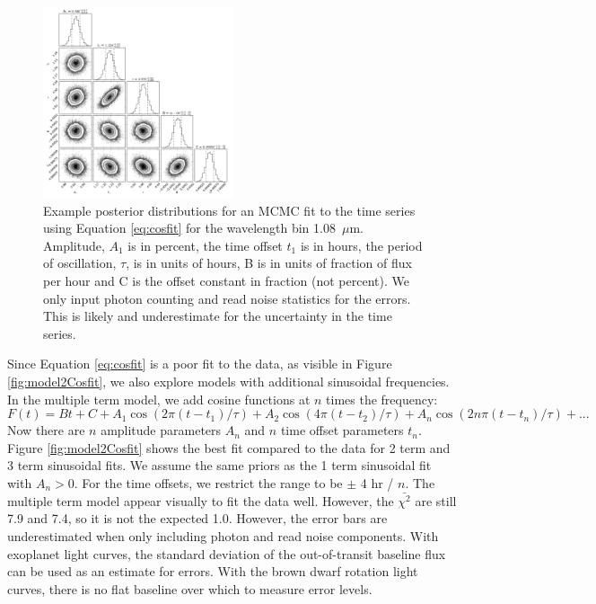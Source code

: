 \documentclass[twocolumn]{aastex6}
\begin{document}
\begin{figure}
\begin{centering}
\includegraphics[width=0.5\textwidth]{corner_example.pdf}
\caption{Example posterior distributions for an MCMC fit to the time series using Equation \ref{eq:cosfit} for the wavelength bin 1.08~$\mu$m.
Amplitude, $A_1$ is in percent, the time offset $t_1$ is in hours, the period of oscillation, $\tau$, is in units of hours, B is in units of fraction of flux per hour and C is the offset constant in fraction (not percent).
We only input photon counting and read noise statistics for the errors.
This is likely and underestimate for the uncertainty in the time series.
}\label{fig:postCosfit}
\end{centering}
\end{figure}

Since Equation \ref{eq:cosfit} is a poor fit to the data, as visible in Figure \ref{fig:model2Cosfit}, we also explore models with additional sinusoidal frequencies.
In the multiple term model, we add cosine functions at $n$ times the frequency:
\begin{equation}\label{eq:cosfitMultiTerm}
F(t) = B t + C + A_1 \cos(2 \pi (t - t_1)/\tau) + A_2 \cos(4 \pi (t - t_2)/\tau) + A_n \cos(2 n \pi (t - t_n)/\tau) +  ...
\end{equation}
Now there are $n$ amplitude parameters $A_n$ and $n$ time offset parameters $t_n$.
Figure \ref{fig:model2Cosfit} shows the best fit compared to the data for 2 term and 3 term sinusoidal fits.
We assume the same priors as the 1 term sinusoidal fit with  $A_n > 0$.
For the time offsets, we restrict the range to be $\pm$ 4 hr / $n$.
The multiple term model appear visually to fit the data well.
However, the $\bar{\chi^2}$ are still 7.9 and 7.4, so it is not the expected 1.0.
However, the error bars are underestimated when only including photon and read noise components.
With exoplanet light curves, the standard deviation of the out-of-transit baseline flux can be used as an estimate for errors. With the brown dwarf rotation light curves, there is no flat baseline over which to measure error levels.
\end{document}
